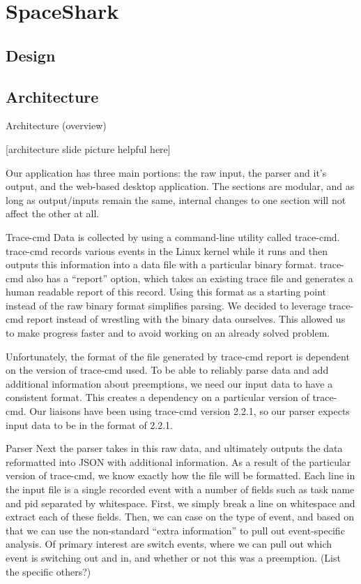\documentclass{hmcclinic}
\begin{document}
\chapter{SpaceShark}
\section{Design}
\section{Architecture} %

  Architecture (overview)

  [architecture slide picture helpful here]

  Our application has three main portions: the raw input, the parser and it’s output, and the web-based desktop application. The sections are modular, and as long as output/inputs remain the same, internal changes to one section will not affect the other at all.

  Trace-cmd
  Data is collected by using a command-line utility called trace-cmd. trace-cmd records various events in the Linux kernel while it runs and then outputs this information into a data file with a particular binary format. trace-cmd also has a “report'' option, which takes an existing trace
  file and generates a human readable report of this record. Using this format as a starting point instead of the raw binary format simplifies parsing.  We decided to leverage trace-cmd report instead of wrestling with the binary data ourselves. This allowed us to make progress faster and to avoid working on an already solved problem.

   Unfortunately, the format of the file generated by trace-cmd report is dependent on the version of trace-cmd used. To be able to reliably parse data and add additional information about preemptions, we need our input data to have a consistent format. This creates a dependency on a particular version of trace-cmd. Our liaisons have been using trace-cmd version 2.2.1, so our parser expects input data to be in the format of 2.2.1.



  Parser
  Next the parser takes in this raw data, and ultimately outputs the data reformatted into JSON with additional information. As a result of the particular version of trace-cmd, we know exactly how the file will be formatted. Each line in the input file is a single recorded event with a number of fields such as task name and pid separated by whitespace. First, we simply break a line on whitespace and extract each of these fields. Then, we can case on the type of event, and based on that we can use the non-standard “extra information” to pull out event-specific analysis. Of primary interest are switch events, where we can pull out which event is switching out and in, and whether or not this was a preemption. (List the specific others?)
\end{document}
